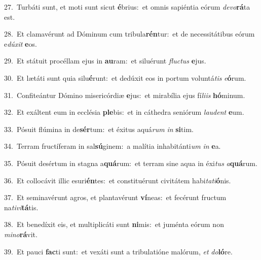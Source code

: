 {\numbfont\textcolor{\numbcolor}{27.}}~Turbáti sunt, et moti sunt sicut \textbf{é}\-brius:~\star et omnis sapiéntia eórum \textit{de}\-\textit{vo}\textbf{rá}ta est.\par
{\numbfont\textcolor{\numbcolor}{28.}}~Et clamavérunt ad Dóminum cum tribula\-\textbf{rén}\-tur:~\star et de necessitátibus eórum e\-\textit{dú}\-\textit{xit} \textbf{e}\-os.\par
{\numbfont\textcolor{\numbcolor}{29.}}~Et státuit procéllam ejus in \textbf{au}\-ram:~\star et siluérunt \textit{fluc}\-\textit{tus} \textbf{e}\-jus.\par
{\numbfont\textcolor{\numbcolor}{30.}}~Et lætáti sunt quia silu\-\textbf{é}\-runt:~\star et dedúxit eos in portum voluntá\textit{tis} \textit{e}\-\textbf{ó}rum.\par
{\numbfont\textcolor{\numbcolor}{31.}}~Confiteántur Dómino misericórdiæ \textbf{e}\-jus:~\star et mirabília ejus fí\-\textit{li}\-\textit{is} \textbf{hó}\-minum.\par
{\numbfont\textcolor{\numbcolor}{32.}}~Et exáltent eum in ecclésia \textbf{ple}\-bis:~\star et in cáthedra seniórum \textit{lau}\-\textit{dent} \textbf{e}\-um.\par
{\numbfont\textcolor{\numbcolor}{33.}}~Pósuit flúmina in de\-\textbf{sér}\-tum:~\star et éxitus aquá\textit{rum} \textit{in} \textbf{si}\-tim.\par
{\numbfont\textcolor{\numbcolor}{34.}}~Terram fructíferam in sal\-\textbf{sú}\-ginem:~\star a malítia inhabitánti\textit{um} \textit{in} \textbf{e}\-a.\par
{\numbfont\textcolor{\numbcolor}{35.}}~Pósuit desértum in stagna a\-\textbf{quá}\-rum:~\star et terram sine aqua in éxi\textit{tus} \textit{a}\-\textbf{quá}rum.\par
{\numbfont\textcolor{\numbcolor}{36.}}~Et collocávit illic esuri\-\textbf{én}\-tes:~\star et constituérunt civitátem habi\-\textit{ta}\-\textit{ti}\textbf{ó}nis.\par
{\numbfont\textcolor{\numbcolor}{37.}}~Et seminavérunt agros, et plantavérunt \textbf{ví}\-neas:~\star et fecérunt fructum na\-\textit{ti}\-\textit{vi}\textbf{tá}tis.\par
{\numbfont\textcolor{\numbcolor}{38.}}~Et benedíxit eis, et multiplicáti sunt \textbf{ni}\-mis:~\star et juménta eórum non \textit{mi}\-\textit{no}\textbf{rá}vit.\par
{\numbfont\textcolor{\numbcolor}{39.}}~Et pauci \textbf{fac}\-ti sunt:~\star et vexáti sunt a tribulatióne malórum, \textit{et} \textit{do}\-\textbf{ló}re.\par
